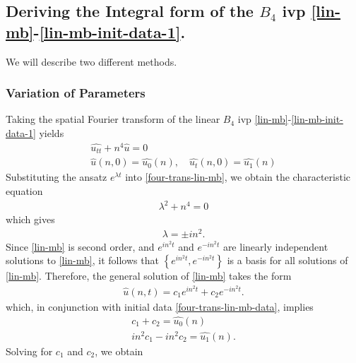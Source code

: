 \documentclass[12pt,reqno]{amsart}
\numberwithin{equation}{section}  %
\numberwithin{figure}{section}
\newcommand{\wh}{\widehat}
\theoremstyle{plain}
\theoremstyle{definition}
\theoremstyle{remark}
\begin{document}
\subsection{Deriving the Integral form of the $B_{4}$ ivp
\eqref{lin-mb}-\eqref{lin-mb-init-data-1}.} 
\label{ssec:integral-form-deriv}
We will describe two different methods.
\subsubsection{Variation of Parameters} 
\label{sssec:var-param}
Taking the spatial Fourier transform of the linear $B_{4}$ ivp
\eqref{lin-mb}-\eqref{lin-mb-init-data-1} yields
%
%
\begin{gather}
  \wh{u_{tt}} + n^{4} \wh{u} = 0
  \label{four-trans-lin-mb}
  \\
  \wh{u}(n, 0) = \wh{u_{0}}(n), \quad \wh{u_{t}}(n, 0) = \wh{u_{1}}(n)
  \label{four-trans-lin-mb-data}
\end{gather}
Substituting the ansatz $e^{\lambda t}$ into \eqref{four-trans-lin-mb}, we
obtain the characteristic equation
%
%
\begin{equation*}
\begin{split}
  \lambda^{2} + n^{4} = 0
\end{split}
\end{equation*}
%
%
which gives 
%
%
\begin{equation*}
\begin{split}
  \lambda = \pm in^{2}.
\end{split}
\end{equation*}
%
Since
\eqref{lin-mb} is second order, and $e^{in^{2}t}$ and $e^{-in^{2}t}$ are
linearly independent solutions to \eqref{lin-mb}, it follows that $\left\{
e^{in^{2}t}, e^{-in^{2}t}
\right\}$ is a basis for all solutions of \eqref{lin-mb}. Therefore, the general
solution of \eqref{lin-mb} takes the form
%
%
\begin{equation}
  \label{explicit-homog-soln}
\begin{split}
  \wh{u}(n,t) = c_{1}e^{in^{2}t} + c_{2}e^{-in^{2}t}.
\end{split}
\end{equation}
%
%
which, in conjunction with initial data 
\eqref{four-trans-lin-mb-data}, implies
%
%
\begin{gather*}
   c_{1} + c_{2} = \wh{u_{0}}(n)
  \\
   in^{2}c_{1} - in^{2}c_{2} = \wh{u_{1}}(n).
\end{gather*}
%
%
Solving for $c_{1}$ and $c_{2}$, we obtain
\end{document}
